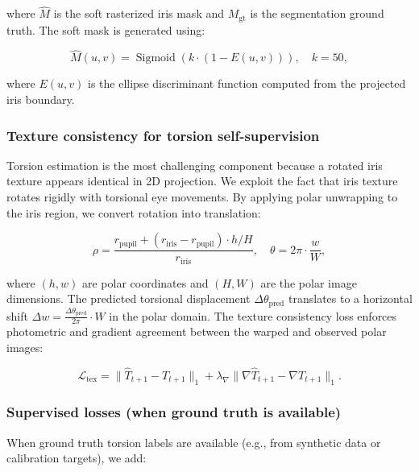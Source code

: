 \documentclass[review]{elsarticle}
\begin{document}
where $\hat{M}$ is the soft rasterized iris mask and $M_{\text{gt}}$ is the segmentation ground truth. The soft mask is generated using:

\begin{equation}
\hat{M}(u,v) = \operatorname{Sigmoid}\left(k \cdot \left(1 - E(u,v)\right)\right),\quad k=50,
\label{eq:soft_raster}
\end{equation}

where $E(u,v)$ is the ellipse discriminant function computed from the projected iris boundary.

\subsubsection{Texture consistency for torsion self-supervision}

Torsion estimation is the most challenging component because a rotated iris texture appears identical in 2D projection. We exploit the fact that iris texture rotates rigidly with torsional eye movements. By applying polar unwrapping to the iris region, we convert rotation into translation:

\begin{equation}
\rho = \frac{r_{\text{pupil}} + (r_{\text{iris}} - r_{\text{pupil}})\cdot h/H}{r_{\text{iris}}},\quad
\theta = 2\pi \cdot \frac{w}{W},
\label{eq:polar}
\end{equation}

where $(h,w)$ are polar coordinates and $(H,W)$ are the polar image dimensions. The predicted torsional displacement $\Delta\theta_{\text{pred}}$ translates to a horizontal shift $\Delta w = \frac{\Delta\theta_{\text{pred}}}{2\pi}\cdot W$ in the polar domain. The texture consistency loss enforces photometric and gradient agreement between the warped and observed polar images:

\begin{equation}
\mathcal{L}_{\text{tex}} = \|\hat{T}_{t+1} - T_{t+1}\|_1 + \lambda_{\nabla}\|\nabla\hat{T}_{t+1} - \nabla T_{t+1}\|_1.
\label{eq:texture_loss}
\end{equation}

\subsubsection{Supervised losses (when ground truth is available)}

When ground truth torsion labels are available (e.g., from synthetic data or calibration targets), we add:
\end{document}
